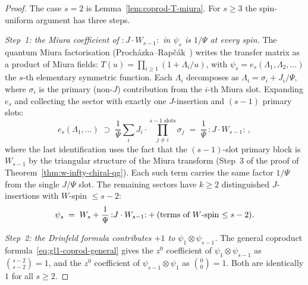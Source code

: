 \begin{proof}
The case $s=2$ is Lemma~\ref{lem:coprod-T-miura}.  For
$s\geq3$ the spin-uniform argument has three steps.

\emph{Step~1: the Miura coefficient of
${:}J \cdot W_{s-1}{:}$ in $\psi_s$ is $1/\Psi$
at every spin.}
The quantum Miura factorisation
\textup{(}Proch\'azka--Rap\v{c}\'ak~\cite{PR19}\textup{)}
writes the transfer matrix as a product of Miura fields:
$T(u) = \prod_{i \geq 1}(1 + \Lambda_i/u)$, with
$\psi_s = e_s(\Lambda_1, \Lambda_2, \ldots)$ the $s$-th
elementary symmetric function.
Each $\Lambda_i$ decomposes as
$\Lambda_i = \sigma_i + J_i/\Psi$, where
$\sigma_i$ is the primary \textup{(}non-$J$\textup{)}
contribution from the $i$-th Miura slot.
Expanding $e_s$ and collecting the sector with exactly
one $J$-insertion and $(s-1)$ primary slots:
\[
 e_s(\Lambda_1, \ldots)
 \;\supset\;
 \frac{1}{\Psi}
 \sum_{i}
 J_i \cdot \prod_{j \neq i}^{s-1\text{ slots}} \sigma_j
 \;=\;
 \frac{1}{\Psi}\,{:}J \cdot W_{s-1}{:}\,,
\]
where the last identification uses the fact that the
$(s-1)$-slot primary block is $W_{s-1}$ by the triangular
structure of the Miura transform
\textup{(}Step~3 of the proof of
Theorem~\textup{\ref{thm:w-infty-chiral-qg}}\textup{)}.
Each such term carries the same factor $1/\Psi$ from
the single $J/\Psi$ slot.
The remaining sectors have $k \geq 2$ distinguished
$J$-insertions with $W$-spin $\leq s - 2$:
\begin{equation}\label{eq:miura-triangular}
 \psi_s
 \;=\;
 W_s + \frac{1}{\Psi}\,{:}J \cdot W_{s-1}{:}
 + (\textup{terms of $W$-spin $\leq s-2$}).
\end{equation}

\emph{Step~2: the Drinfeld formula contributes $+1$ to
$\psi_1 \otimes \psi_{s-1}$.}
The general coproduct
formula~\eqref{eq:gl1-coprod-general} gives the
$z^0$ coefficient of $\psi_1 \otimes \psi_{s-1}$ as
$\binom{s - 2}{s - 2} = 1$, and the $z^0$ coefficient
of $\psi_{s-1} \otimes \psi_1$ as
$\binom{0}{0} = 1$. Both are identically $1$ for all
$s \geq 2$.


\end{proof}
